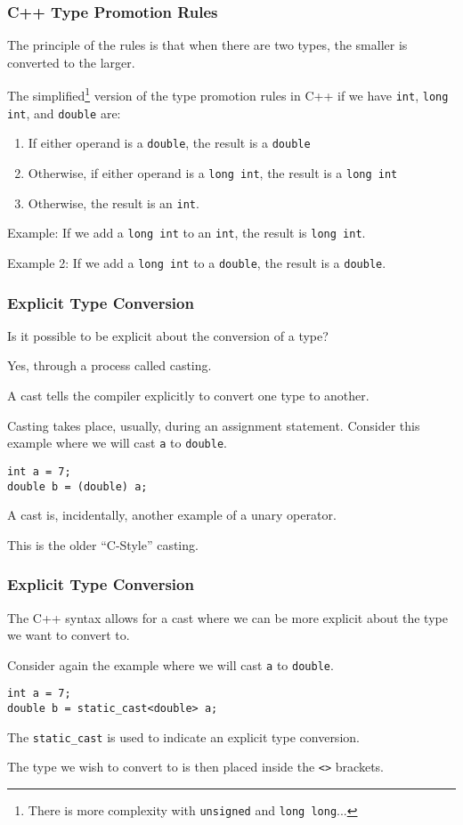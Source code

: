 \begin{frame}
\frametitle{C++ Type Promotion Rules}

The principle of the rules is that when there are two types, the smaller is converted to the larger.

The simplified\footnote{There is more complexity with \texttt{unsigned} and \texttt{long long}...} version of the type promotion rules in C++ if we have \texttt{int}, \texttt{long int}, and \texttt{double} are:

\begin{enumerate}
	\item If either operand is a \texttt{double}, the result is a \texttt{double}
	\item Otherwise, if either operand is a \texttt{long int}, the result is a \texttt{long int}
	\item Otherwise, the result is an \texttt{int}.
\end{enumerate}

Example: If we add a \texttt{long int} to an \texttt{int}, the result is \texttt{long int}.

Example 2: If we add a \texttt{long int} to a \texttt{double}, the result is a \texttt{double}.

\end{frame}

\begin{frame}[fragile]
\frametitle{Explicit Type Conversion}
Is it possible to be explicit about the conversion of a type?

Yes, through a process called \alert{casting}.

A \alert{cast} tells the compiler explicitly to convert one type to another.

Casting takes place, usually, during an assignment statement. Consider this example where we will cast \texttt{a} to \texttt{double}.
\vspace{-3em}
\begin{verbatim}
int a = 7;
double b = (double) a;
\end{verbatim}

A cast is, incidentally, another example of a unary operator.

This is the older ``C-Style'' casting.

\end{frame}

\begin{frame}[fragile]
\frametitle{Explicit Type Conversion}

The C++ syntax allows for a cast where we can be more explicit about the type we want to convert to.

Consider again the example where we will cast \texttt{a} to \texttt{double}.

\begin{verbatim}
int a = 7;
double b = static_cast<double> a;
\end{verbatim}

The \texttt{static\_cast} is used to indicate an explicit type conversion.

The type we wish to convert to is then placed inside the \texttt{<>} brackets.

\end{frame}

